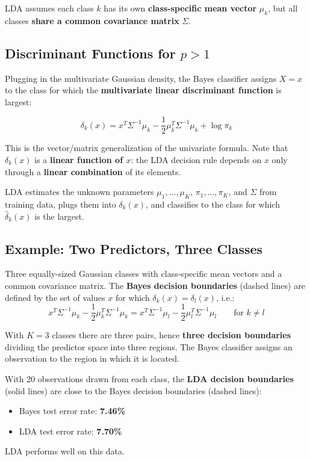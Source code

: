 \documentclass[11pt,a4paper]{article}
\theoremstyle{definition}
\theoremstyle{plain}
\theoremstyle{remark}
\begin{document}
LDA assumes each class $k$ has its own \textbf{class-specific mean vector} $\mu_k$, but all classes \textbf{share a common covariance matrix} $\Sigma$.

\subsection{Discriminant Functions for \texorpdfstring{$p > 1$}{p>1}}

Plugging in the multivariate Gaussian density, the Bayes classifier assigns $X = x$ to the class for which the \textbf{multivariate linear discriminant function} is largest:

\begin{tcolorbox}[colback=blue!5!white,colframe=blue!75!black,title=\textbf{Linear Discriminant Function ($p > 1$)}]
\[
    \delta_k(x) = x^T \Sigma^{-1} \mu_k - \frac{1}{2} \mu_k^T \Sigma^{-1} \mu_k + \log \pi_k
\]
\end{tcolorbox}

This is the vector/matrix generalization of the univariate formula. Note that $\delta_k(x)$ is a \textbf{linear function of $x$}: the LDA decision rule depends on $x$ only through a \textbf{linear combination} of its elements.

LDA estimates the unknown parameters $\mu_1, \ldots, \mu_K$, $\pi_1, \ldots, \pi_K$, and $\Sigma$ from training data, plugs them into $\delta_k(x)$, and classifies to the class for which $\hat{\delta}_k(x)$ is the largest.

\subsection{Example: Two Predictors, Three Classes}

Three equally-sized Gaussian classes with class-specific mean vectors and a common covariance matrix. The \textbf{Bayes decision boundaries} (dashed lines) are defined by the set of values $x$ for which $\delta_k(x) = \delta_l(x)$, i.e.:
\[
    x^T \Sigma^{-1} \mu_k - \frac{1}{2}\mu_k^T \Sigma^{-1} \mu_k = x^T \Sigma^{-1} \mu_l - \frac{1}{2}\mu_l^T \Sigma^{-1} \mu_l \qquad \text{for } k \neq l
\]

With $K = 3$ classes there are three pairs, hence \textbf{three decision boundaries} dividing the predictor space into three regions. The Bayes classifier assigns an observation to the region in which it is located.

With 20 observations drawn from each class, the \textbf{LDA decision boundaries} (solid lines) are close to the Bayes decision boundaries (dashed lines):
\begin{itemize}
    \item Bayes test error rate: \textbf{7.46\%}
    \item LDA test error rate: \textbf{7.70\%}
\end{itemize}
LDA performs well on this data.
\end{document}
